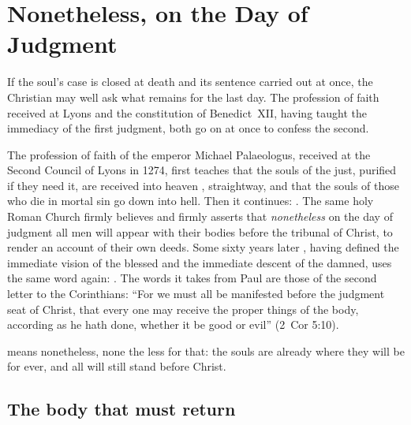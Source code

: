 \section{Nonetheless, on the Day of Judgment}\label{sec:general}

If the soul's case is closed at death and its sentence carried out at once, the Christian may well ask what remains for the last day. The profession of faith received at Lyons and the constitution of Benedict~XII, having taught the immediacy of the first judgment, both go on at once to confess the second.

The profession of faith of the emperor Michael Palaeologus, received at the Second Council of Lyons in 1274, first teaches that the souls of the just, purified if they need it, are received into heaven , straightway, and that the souls of those who die in mortal sin go down  into hell. Then it continues: . The same holy Roman Church firmly believes and firmly asserts that \emph{nonetheless} on the day of judgment all men will appear with their bodies before the tribunal of Christ, to render an account of their own deeds. Some sixty years later , having defined the immediate vision of the blessed and the immediate descent of the damned, uses the same word again: . The words it takes from Paul are those of the second letter to the Corinthians: ``For we must all be manifested before the judgment seat of Christ, that every one may receive the proper things of the body, according as he hath done, whether it be good or evil'' (2~Cor 5:10).

 means nonetheless, none the less for that: the souls are already where they will be for ever, and all will still stand before Christ.

\subsection{The body that must return}

